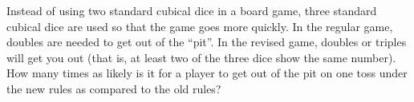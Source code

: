 Instead of using two standard cubical dice in a board game, three standard cubical dice are used so that the game goes more quickly. In the regular game, doubles are needed to get out of the ``pit''. In the revised game, doubles or triples will get you out (that is, at least two of the three dice show the same number). How many times as likely is it for a player to get out of the pit on one toss under the new rules as compared to the old rules?
